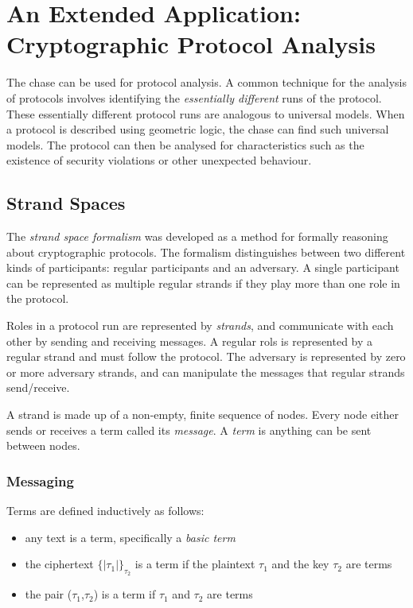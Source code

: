 \section{An Extended Application: \\ Cryptographic Protocol Analysis}

	The chase can be used for protocol analysis. A common technique for the analysis
	of protocols involves identifying the \emph{essentially different} runs of
	the protocol. These essentially different protocol runs are analogous to
	universal models. When a protocol is described using geometric logic, the
	chase can find such universal models. The protocol can then be analysed for
	characteristics such as the existence of security violations or other
	unexpected behaviour.

	\subsection{Strand Spaces}
	\label{sec:application.strand_spaces}

		The \emph{strand space formalism} was developed as a method for
		formally reasoning about cryptographic protocols. The formalism
		distinguishes between two different kinds of participants: regular
		participants and an adversary. A single participant can be represented
		as multiple regular strands if they play more than one role in the
		protocol.

		Roles in a protocol run are represented by \emph{strands}, and
		communicate with each other by sending and receiving messages. A
		regular rols is represented by a regular strand and must follow the
		protocol. The adversary is represented by zero or more adversary
		strands, and can manipulate the messages that regular strands
		send/receive.

		A strand is made up of a non-empty, finite sequence of nodes. Every
		node either sends or receives a term called its \emph{message}. A
		\emph{term} is anything can be sent between nodes.

		\subsubsection{Messaging}

			Terms are defined inductively as follows:

			\begin{itemize}
			\item any text is a term, specifically a \emph{basic term}
			\item the ciphertext $\{|\tau_1|\}_{\tau_2}$ is a term if the plaintext $\tau_1$ and the key $\tau_2$ are terms
			\item the pair ($\tau_1$,$\tau_2$) is a term if $\tau_1$ and $\tau_2$ are terms
			\end{itemize}

